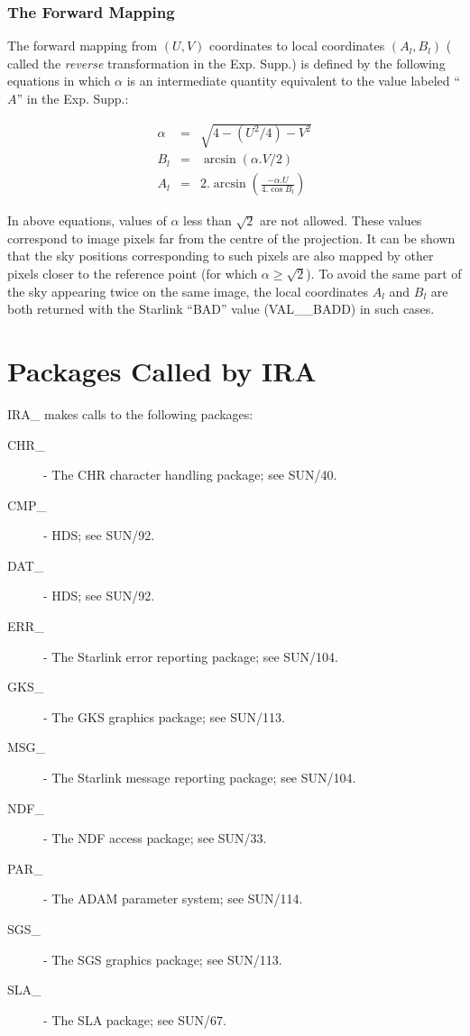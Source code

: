 \subsubsection {The Forward Mapping}
The forward mapping from $(U,V)$ coordinates to local coordinates 
$(A_{l},B_{l})$
( called the {\em reverse} transformation in the Exp. Supp.) is defined by
the following equations in which $\alpha$ is an intermediate quantity equivalent
to the value labeled ``$A$'' in the Exp. Supp.: 

\begin{eqnarray*}
\alpha & = & \sqrt{4-(U^{2}/4)-V^{2} }\\
B_{l} & = & \arcsin (\alpha.V/2)\\
A_{l} & = & 2.\arcsin\left(\frac{-\alpha.U}{4.\cos B_{l}}\right)
\end{eqnarray*}

In above equations, values of $\alpha$ less than $\sqrt{2}$ are not allowed.
These values correspond to image pixels far from the centre of the projection.
It can be shown that the sky positions corresponding to such pixels are also
mapped by other pixels closer to the reference point (for which
$\alpha\geq\sqrt{2}$). To avoid the same part of the sky appearing twice on the
same image, the local coordinates $A_{l}$ and $B_{l}$ are both returned with the
Starlink ``BAD'' value (VAL\_\_BADD) in such cases. 

\section {Packages Called by IRA}
IRA\_ makes calls to the following packages:
\begin {description}
\item [CHR\_] - The CHR character handling package; see SUN/40.
\item [CMP\_] - HDS; see SUN/92.
\item [DAT\_] - HDS; see SUN/92.
\item [ERR\_] - The Starlink error reporting package; see SUN/104.
\item [GKS\_] - The GKS graphics package; see SUN/113.
\item [MSG\_] - The Starlink message reporting package; see SUN/104.
\item [NDF\_] - The NDF access package; see SUN/33.
\item [PAR\_] - The ADAM parameter system; see SUN/114.
\item [SGS\_] - The SGS graphics package; see SUN/113.
\item [SLA\_] - The SLA package; see SUN/67.
\end{description}

